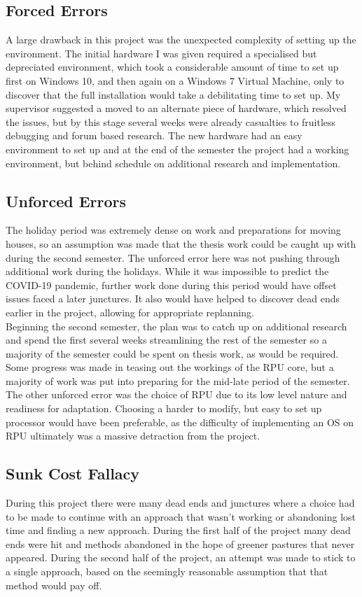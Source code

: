 	\subsection{Forced Errors}
		A large drawback in this project was the unexpected complexity of setting up the environment. The initial hardware I was given required a specialised but depreciated environment, which took a considerable amount of time to set up first on Windows 10, and then again on a Windows 7 Virtual Machine, only to discover that the full installation would take a debilitating time to set up. My supervisor suggested a moved to an alternate piece of hardware, which resolved the issues, but by this stage several weeks were already casualties to fruitless debugging and forum based research. The new hardware had an easy environment to set up and at the end of the semester the project had a working environment, but behind schedule on additional research and implementation.\\
		
		
	\subsection{Unforced Errors}
		The holiday period was extremely dense on work and preparations for moving houses, so an assumption was made that the thesis work could be caught up with during the second semester. The unforced error here was not pushing through additional work during the holidays. While it was impossible to predict the COVID-19 pandemic, further work done during this period would have offset issues faced a later junctures. It also would have helped to discover dead ends earlier in the project, allowing for appropriate replanning.\\
		Beginning the second semester, the plan was to catch up on additional research and spend the first several weeks streamlining the rest of the semester so a majority of the semester could be spent on thesis work, as would be required. Some progress was made in teasing out the workings of the RPU core, but a majority of work was put into preparing for the mid-late period of the semester.\\
		The other unforced error was the choice of RPU due to its low level nature and readiness for adaptation. Choosing a harder to modify, but easy to set up processor would have been preferable, as the difficulty of implementing an OS on RPU ultimately was a massive detraction from the project.
		
	\subsection{Sunk Cost Fallacy}
		During this project there were many dead ends and junctures where a choice had to be made to continue with an approach that wasn't working or abandoning lost time and finding a new approach. During the first half of the project many dead ends were hit and methods abandoned in the hope of greener pastures that never appeared. During the second half of the project, an attempt was made to stick to a single approach, based on the seemingly reasonable assumption that that method would pay off.
	

